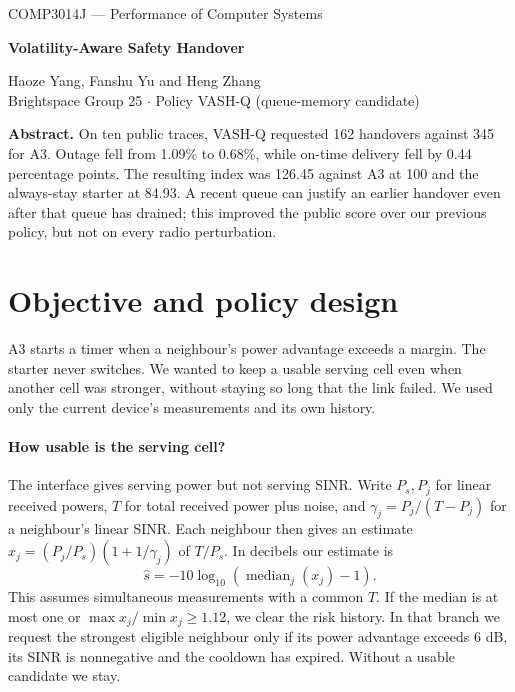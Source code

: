 \documentclass[11pt,a4paper]{article}
\begin{document}
\begin{center}
{\small COMP3014J --- Performance of Computer Systems}\par
{\Large\bfseries Volatility-Aware Safety Handover}\par
Haoze Yang, Fanshu Yu and Heng Zhang\\
{\small Brightspace Group 25 \quad $\cdot$ \quad Policy VASH-Q (queue-memory candidate)}
\end{center}
\textbf{Abstract.}
On ten public traces, VASH-Q requested 162 handovers against 345 for A3. Outage fell from 1.09\% to 0.68\%, while on-time delivery fell by 0.44 percentage points. The resulting index was 126.45 against A3 at 100 and the always-stay starter at 84.93. A recent queue can justify an earlier handover even after that queue has drained; this improved the public score over our previous policy, but not on every radio perturbation.
\section{Objective and policy design}
A3 starts a timer when a neighbour's power advantage exceeds a margin. The starter never switches. We wanted to keep a usable serving cell even when another cell was stronger, without staying so long that the link failed. We used only the current device's measurements and its own history.
\paragraph{How usable is the serving cell?}
The interface gives serving power but not serving SINR. Write $P_s,P_j$ for linear received powers, $T$ for total received power plus noise, and $\gamma_j=P_j/(T-P_j)$ for a neighbour's linear SINR. Each neighbour then gives an estimate $x_j=(P_j/P_s)(1+1/\gamma_j)$ of $T/P_s$. In decibels our estimate is
\[
 \widehat s=-10\log_{10}\!\left(\operatorname{median}_j(x_j)-1\right).
\]
This assumes simultaneous measurements with a common $T$. If the median is at most one or $\max x_j/\min x_j\ge1.12$, we clear the risk history. In that branch we request the strongest eligible neighbour only if its power advantage exceeds 6 dB, its SINR is nonnegative and the cooldown has expired. Without a usable candidate we stay.
\end{document}
